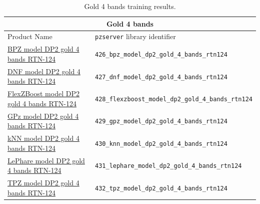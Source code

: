 \begin{table}
\centering
\begin{tabular}{ll}
\hline
\multicolumn{2}{c}{Gold 4 bands} \\ \hline
Product Name & \texttt{pzserver} library identifier \\
\hline
\hline
\href{https://pzserver.linea.org.br/product/426_bpz_model_dp2_gold_4_bands_rtn124}
{BPZ model DP2 gold 4 bands RTN-124}
&
\texttt{426\_bpz\_model\_dp2\_gold\_4\_bands\_rtn124}
\\
\href{https://pzserver.linea.org.br/product/427_dnf_model_dp2_gold_4_bands_rtn124}
{DNF model DP2 gold 4 bands RTN-124}
&
\texttt{427\_dnf\_model\_dp2\_gold\_4\_bands\_rtn124}
\\
\href{https://pzserver.linea.org.br/product/428_flexzboost_model_dp2_gold_4_bands_rtn124}
{FlexZBoost model DP2 gold 4 bands RTN-124}
&
\texttt{428\_flexzboost\_model\_dp2\_gold\_4\_bands\_rtn124}
\\
\href{https://pzserver.linea.org.br/product/429_gpz_model_dp2_gold_4_bands_rtn124}
{GPz model DP2 gold 4 bands RTN-124}
&
\texttt{429\_gpz\_model\_dp2\_gold\_4\_bands\_rtn124}
\\
\href{https://pzserver.linea.org.br/product/430_knn_model_dp2_gold_4_bands_rtn124}
{kNN model DP2 gold 4 bands RTN-124}
&
\texttt{430\_knn\_model\_dp2\_gold\_4\_bands\_rtn124}
\\
\href{https://pzserver.linea.org.br/product/431_lephare_model_dp2_gold_4_bands_rtn124}
{LePhare model DP2 gold 4 bands RTN-124}
&
\texttt{431\_lephare\_model\_dp2\_gold\_4\_bands\_rtn124}
\\
\href{https://pzserver.linea.org.br/product/432_tpz_model_dp2_gold_4_bands_rtn124}
{TPZ model DP2 gold 4 bands RTN-124}
&
\texttt{432\_tpz\_model\_dp2\_gold\_4\_bands\_rtn124}
\\
\hline
\end{tabular}
\caption{Gold 4 bands training results.}
\label{tab:pzserver-gold-4-bands}
\end{table}


